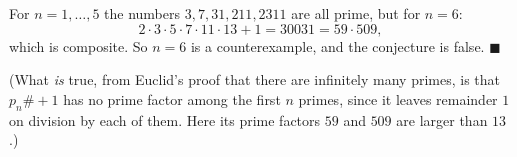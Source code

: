 For $n=1,\dots,5$ the numbers $3,7,31,211,2311$ are all prime, but for $n=6$:
\[
2\cdot3\cdot5\cdot7\cdot11\cdot13+1=30031=59\cdot509,
\]
which is composite. So $n=6$ is a counterexample, and the conjecture is false. $\blacksquare$

(What \emph{is} true, from Euclid's proof that there are infinitely many primes, is that $p_n\#+1$ has no prime factor among the first $n$ primes, since it leaves remainder $1$ on division by each of them. Here its prime factors $59$ and $509$ are larger than $13$.)
